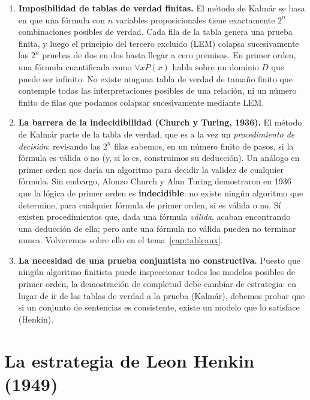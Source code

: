 \begin{enumerate}
    \item \textbf{Imposibilidad de tablas de verdad finitas.}  
    El método de Kalmár se basa en que una fórmula con $n$ variables proposicionales tiene exactamente $2^n$ combinaciones posibles de verdad. Cada fila de la tabla genera una prueba finita, y luego el principio del tercero excluido (LEM) colapsa sucesivamente las $2^n$ pruebas de dos en dos hasta llegar a cero premisas.  
    En primer orden, una fórmula cuantificada como $\forall x P(x)$ habla sobre un dominio $D$ que puede ser infinito. No existe ninguna tabla de verdad de tamaño finito que contemple todas las interpretaciones posibles de una relación, ni un número finito de filas que podamos colapsar sucesivamente mediante LEM.
    
    \item \textbf{La barrera de la indecidibilidad (Church y Turing, 1936).}  
    El método de Kalmár parte de la tabla de verdad, que es a la vez un \emph{procedimiento de decisión}: revisando las $2^n$ filas sabemos, en un número finito de pasos, si la fórmula es válida o no (y, si lo es, construimos su deducción). Un análogo en primer orden nos daría un algoritmo para decidir la validez de cualquier fórmula.  
    Sin embargo, Alonzo Church y Alan Turing demostraron en 1936 que la lógica de primer orden es \textbf{indecidible}: no existe ningún algoritmo que determine, para cualquier fórmula de primer orden, si es válida o no. Sí existen procedimientos que, dada una fórmula \emph{válida}, acaban encontrando una deducción de ella; pero ante una fórmula no válida pueden no terminar nunca. Volveremos sobre ello en el tema~\ref{cap:tableaux}.
    
    \item \textbf{La necesidad de una prueba conjuntista no constructiva.}  
    Puesto que ningún algoritmo finitista puede inspeccionar todos los modelos posibles de primer orden, la demostración de completud debe cambiar de estrategia: en lugar de ir de las tablas de verdad a la prueba (Kalmár), debemos probar que si un conjunto de sentencias es consistente, existe un modelo que lo satisface (Henkin).
\end{enumerate}

\section{La estrategia de Leon Henkin (1949)\ampliacion}\label{sec:estrategia-henkin}

